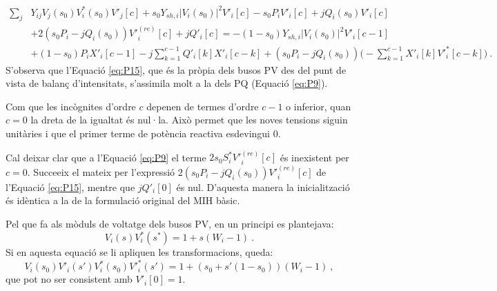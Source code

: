 \begin{equation}
    \begin{split}
    \sum_j &Y_{ij}V_j(s_0)V^*_i(s_0)V'_j[c]+s_0Y_{sh,i}|V_i(s_0)|^2V'_i[c]-s_0P_iV'_i[c]+jQ_i(s_0)V'_i[c]\\
    &+2(s_0P_i-jQ_i(s_0))V'^{(re)}_i[c]+jQ'_i[c]=
    -(1-s_0)Y_{sh,i}|V_i(s_0)|^2V'_i[c-1]\\
    &+(1-s_0)P_iX'_i[c-1]-j\sum_{k=1}^{c-1}Q'_i[k]X'_i[c-k]
    +(s_0P_i-jQ_i(s_0))\biggl(-\sum_{k=1}^{c-1}X'_i[k]V'^{*}_i[c-k]\biggr)\ . 
\end{split}
        \label{eq:P15}
\end{equation}
S'observa que l'Equació \ref{eq:P15}, que és la pròpia dels busos PV des del punt de vista de balanç d'intensitats, s'assimila molt a la dels PQ (Equació \ref{eq:P9}). 

Com que les incògnites d'ordre $c$ depenen de termes d'ordre $c-1$ o inferior, quan $c=0$ la dreta de la igualtat és nul·la. Això permet que les noves tensions siguin unitàries i que el primer terme de potència reactiva esdevingui 0.

Cal deixar clar que a l'Equació \ref{eq:P9} el terme $2s_0S^{*}_iV'^{(re)}_i[c]$ és inexistent per $c=0$. Succeeix el mateix per l'expressió $2(s_0P_i-jQ_i(s_0))V'^{(re)}_i[c]$ de l'Equació \ref{eq:P15}, mentre que $jQ'_i[0]$ és nul. D'aquesta manera la inicialització és idèntica a la de la formulació original del MIH bàsic.  

Pel que fa als mòduls de voltatge dels busos PV, en un principi es plantejava:
\begin{equation}
V_i(s)V^*_i(s^*)=1+s(W_i-1)\ .
        \label{eq:P15x1}
\end{equation}
Si en aquesta equació se li apliquen les transformacions, queda:
\begin{equation}
    V_i(s_0)V'_i(s')V^*_i(s_0)V'^{*}_i(s')=1+(s_0+s'(1-s_0))(W_i-1)\ ,
            \label{eq:P15x2}
    \end{equation}
que pot no ser consistent amb $V'_i[0]=1$. 


